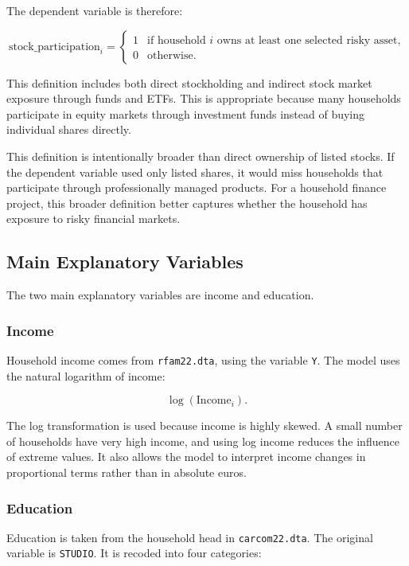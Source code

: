 \documentclass[12pt]{article}
\begin{document}
The dependent variable is therefore:

\[
\text{stock\_participation}_i =
\begin{cases}
1 & \text{if household } i \text{ owns at least one selected risky asset,}\\
0 & \text{otherwise.}
\end{cases}
\]

This definition includes both direct stockholding and indirect stock market exposure through funds and ETFs. This is appropriate because many households participate in equity markets through investment funds instead of buying individual shares directly.

This definition is intentionally broader than direct ownership of listed stocks. If the dependent variable used only listed shares, it would miss households that participate through professionally managed products. For a household finance project, this broader definition better captures whether the household has exposure to risky financial markets.

\subsection{Main Explanatory Variables}

The two main explanatory variables are income and education.

\subsubsection{Income}

Household income comes from \texttt{rfam22.dta}, using the variable \texttt{Y}. The model uses the natural logarithm of income:

\[
\log(\text{Income}_i).
\]

The log transformation is used because income is highly skewed. A small number of households have very high income, and using log income reduces the influence of extreme values. It also allows the model to interpret income changes in proportional terms rather than in absolute euros.

\subsubsection{Education}

Education is taken from the household head in \texttt{carcom22.dta}. The original variable is \texttt{STUDIO}. It is recoded into four categories:
\end{document}
